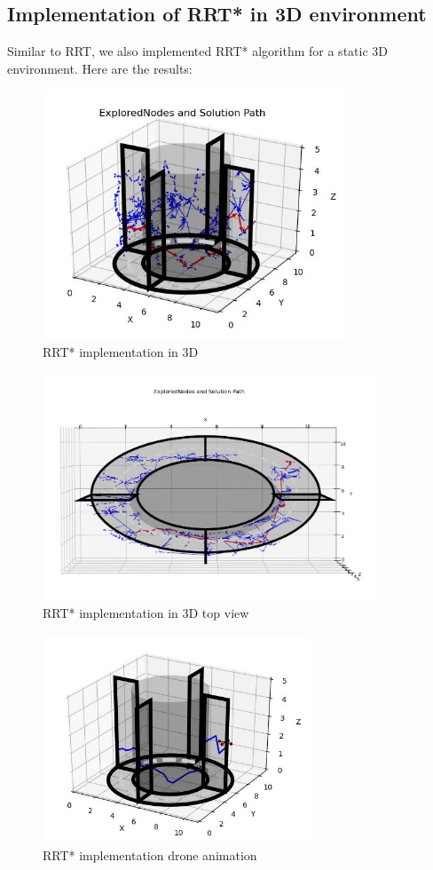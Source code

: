 \documentclass{IEEEtran}
\begin{document}
\subsection{\textbf{Implementation of RRT* in 3D environment}}
Similar to RRT, we also implemented RRT* algorithm for a static 3D environment. Here are the results:
\begin{figure}[h]
    \includegraphics[width=9cm]{rrtstar3d}
    \caption{RRT* implementation in 3D}
    \label{fig:RRT* implementation in 3D}
\end{figure} 
\newpage
\begin{figure}[h]
    \centering
    \includegraphics[width=10cm]{rrtstar3dtop}
    \caption{RRT* implementation in 3D top view}
    \label{fig:RRT* implementation in 3D top view}
\end{figure}
\newpage
 \begin{figure}[h]
    \centering
    \includegraphics[width=8cm]{rrtstar3ddrone}
    \caption{RRT* implementation drone animation}
    \label{fig:RRT* implementation drone animation}
\end{figure}
\end{document}
